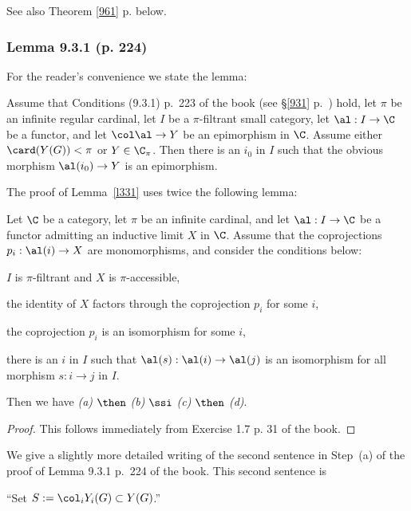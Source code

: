 \documentclass[12pt]{article}
\theoremstyle{remark}
\theoremstyle{definition}
\begin{document}
See also Theorem \ref{961} p.  below.

%

\subsubsection{Lemma 9.3.1 (p. 224)}

For the reader's convenience we state the lemma:

\begin{lem}[Lemma 9.3.1 p. 224]
Assume that Conditions (9.3.1) p.~223 of the book (see \S\ref{931} p.~) hold, let $\pi$ be an infinite regular cardinal, let $I$ be a $\pi$-filtrant small category, let $\al:I\to\C$ be a functor, and let $\col\al\to Y$ be an epimorphism in $\C$. Assume either $\card(Y(G))<\pi$ or $Y\in\C_\pi$. Then there is an $i_0$ in $I$ such that the obvious morphism $\al(i_0)\to Y$ is an epimorphism.
\end{lem}

The proof of Lemma~\ref{l331} uses twice the following lemma:

\begin{lem} 
Let $\C$ be a category, let $\pi$ be an infinite cardinal, and let $\al:I\to\C$ be a functor admitting an inductive limit $X$ in $\C$. Assume that the coprojections $p_i:\al(i)\to X$ are monomorphisms, and consider the conditions below:

 $I$ is $\pi$-filtrant and $X$ is $\pi$-accessible,

 the identity of $X$ factors through the coprojection $p_i$ for some $i$,

 the coprojection $p_i$ is an isomorphism for some $i$,

 there is an $i$ in $I$ such that $\al(s):\al(i)\to\al(j)$ is an isomorphism for all morphism $s:i\to j$ in $I$.

\nn Then we have {\em(a)} $\then$ {\em(b)} $\ssi$ {\em(c)} $\then$ {\em(d)}. 
\end{lem}

\begin{proof}
This follows immediately from Exercise 1.7 p. 31 of the book.
\end{proof}

We give a slightly more detailed writing of the second sentence in Step~(a) of the proof of Lemma 9.3.1 p.~224 of the book. This second sentence is 

``Set $S:=\col_iY_i(G)\subset Y(G)$.'' 
\end{document}
